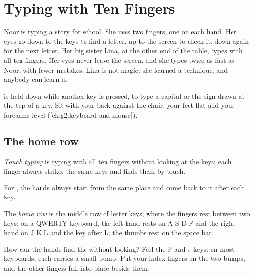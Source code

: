 \chapter{Typing with Ten Fingers}\label{ch:g3:typing-with-ten-fingers}

Noor is typing a story for school. She uses two fingers, one on each hand. Her
eyes go down to the keys to find a letter, up to the screen to check it, down
again for the next letter. Her big sister Lina, at the other end of the table,
types with all ten fingers. Her eyes never leave the screen, and she types
twice as fast as Noor, with fewer mistakes. Lina is not magic: she learned a
technique, and anybody can learn it.

\begin{recall}
 is held down while another key is pressed, to type a capital or
the sign drawn at the top of a key. Sit with your back against the chair, your
feet flat and your forearms level (\cref{ch:g2:keyboard-and-mouse}).
\end{recall}

\section{The home row}

\begin{definition}\label{def:g3:typing-with-ten-fingers:touch-typing}
\emph{Touch typing} is typing with all ten fingers
without looking at the keys: each finger always strikes the same keys and
finds them by touch.
\end{definition}

For , the hands always start from the same place and come back to
it after each key.

\begin{definition}\label{def:g3:typing-with-ten-fingers:home-row}
The \emph{home row} is the middle row of letter keys, where
the fingers rest between two keys: on a QWERTY keyboard, the left hand rests
on A S D F and the right hand on J K L and the key after L; the thumbs rest
on the space bar.
\end{definition}

How can the hands find the  without looking? Feel the F and J keys:
on most keyboards, each carries a small bump. Put your index fingers on the two
bumps, and the other fingers fall into place beside them.

